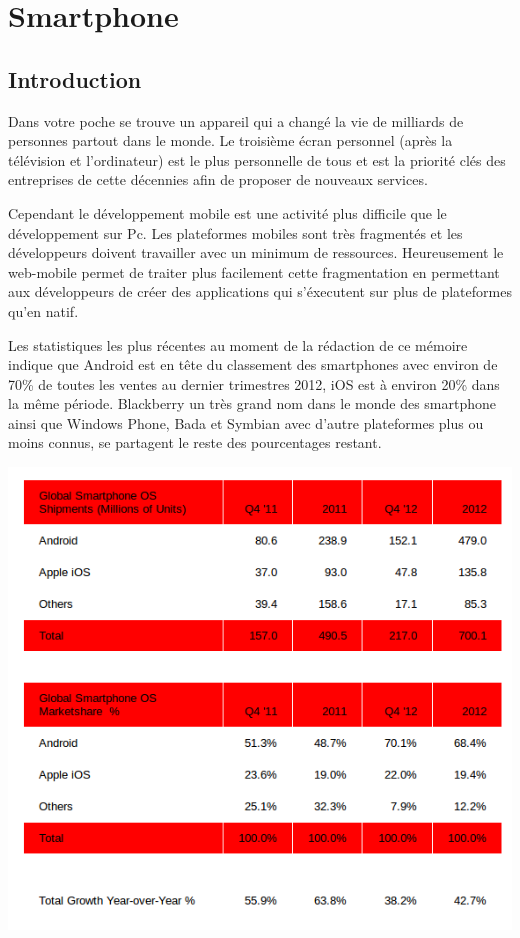 \chapter{Smartphone}
\label{ch:smartphone}

\section{Introduction}

Dans votre poche se trouve un appareil qui a changé la vie de milliards de personnes partout dans le monde. Le troisième écran personnel (après la télévision et l’ordinateur) est le plus personnelle de tous et est la priorité clés des entreprises de cette décennies afin de proposer de nouveaux services.

Cependant le développement mobile est une activité plus difficile que le développement sur Pc. Les plateformes mobiles sont très fragmentés et les développeurs doivent travailler avec un minimum de ressources. Heureusement le web-mobile permet de traiter plus facilement cette fragmentation en permettant aux développeurs de créer des applications qui s’éxecutent sur plus de plateformes qu’en natif.

Les statistiques les plus récentes au moment de la rédaction de ce mémoire indique que Android est en tête du classement des smartphones avec environ de 70\% de toutes les ventes au dernier trimestres 2012, iOS est à environ 20\% dans la même période. Blackberry un très grand nom dans le monde des smartphone ainsi que Windows Phone, Bada et Symbian avec d’autre plateformes plus ou moins connus, se partagent le reste des pourcentages restant.


\begin{center}
\includegraphics[width=14cm]{img/marche_smartphone.png}
\label{Parts de marché smartphone}
\end{center}

